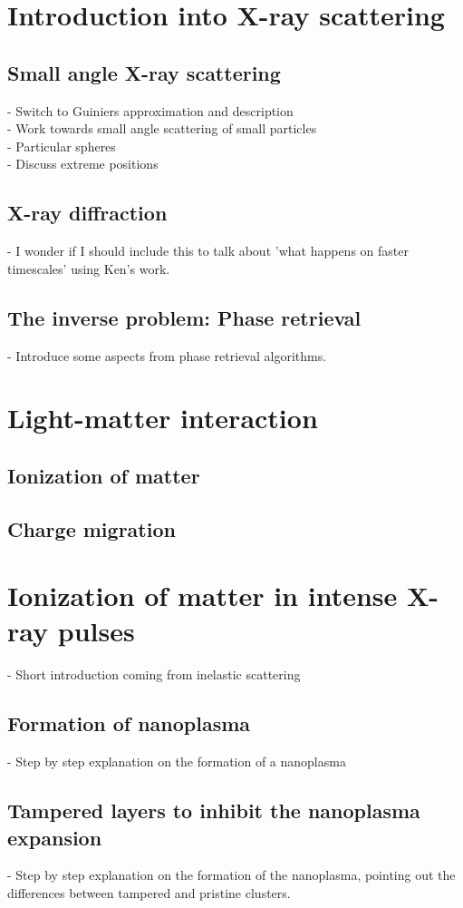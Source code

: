 \section{Introduction into X-ray scattering}

\subsection{Small angle X-ray scattering}
- Switch to Guiniers approximation and description\\
- Work towards small angle scattering of small particles\\
- Particular spheres\\
- Discuss extreme positions
\subsection{X-ray diffraction}
- I wonder if I should include this to talk about 'what happens on faster timescales' using Ken's work.
\subsection{The inverse problem: Phase retrieval}
- Introduce some aspects from phase retrieval algorithms.
\section{Light-matter interaction}
\subsection{Ionization of matter}
\subsection{Charge migration}
\section{Ionization of matter in intense X-ray pulses}
- Short introduction coming from inelastic scattering
\subsection{Formation of nanoplasma}
- Step by step explanation on the formation of a nanoplasma
\subsection{Tampered layers to inhibit the nanoplasma expansion}
- Step by step explanation on the formation of the nanoplasma, pointing out the differences between tampered and pristine clusters.